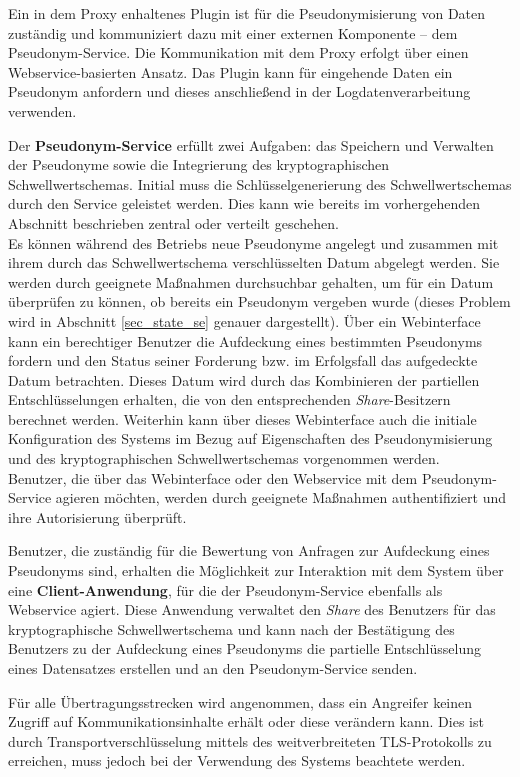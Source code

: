 Ein in dem Proxy enhaltenes Plugin ist für die Pseudonymisierung von Daten zuständig und kommuniziert dazu mit einer externen Komponente -- dem Pseudonym-Service. Die Kommunikation mit dem Proxy erfolgt über einen Webservice-basierten Ansatz. Das Plugin kann für eingehende Daten ein Pseudonym anfordern und dieses anschließend in der Logdatenverarbeitung verwenden.

Der \textbf{Pseudonym-Service} erfüllt zwei Aufgaben: das Speichern und Verwalten der Pseudonyme sowie die Integrierung des kryptographischen Schwellwertschemas. Initial muss die Schlüsselgenerierung des Schwellwertschemas durch den Service geleistet werden. Dies kann wie bereits im vorhergehenden Abschnitt beschrieben zentral oder verteilt geschehen.\\
Es können während des Betriebs neue Pseudonyme angelegt und zusammen mit ihrem durch das Schwellwertschema verschlüsselten Datum abgelegt werden. Sie werden durch geeignete Maßnahmen durchsuchbar gehalten, um für ein Datum überprüfen zu können, ob bereits ein Pseudonym vergeben wurde (dieses Problem wird in Abschnitt \ref{sec_state_se} genauer dargestellt).
Über ein Webinterface kann ein berechtiger Benutzer die Aufdeckung eines bestimmten Pseudonyms fordern und den Status seiner Forderung bzw. im Erfolgsfall das aufgedeckte Datum betrachten. Dieses Datum wird durch das Kombinieren der partiellen Entschlüsselungen erhalten, die von den entsprechenden \textit{Share}-Besitzern berechnet werden. Weiterhin kann über dieses Webinterface auch die initiale Konfiguration des Systems im Bezug auf Eigenschaften des Pseudonymisierung und des kryptographischen Schwellwertschemas vorgenommen werden.\\
Benutzer, die über das Webinterface oder den Webservice mit dem Pseudonym-Service agieren möchten, werden durch geeignete Maßnahmen authentifiziert und ihre Autorisierung überprüft.

Benutzer, die zuständig für die Bewertung von Anfragen zur Aufdeckung eines Pseudonyms sind, erhalten die Möglichkeit zur Interaktion mit dem System über eine \textbf{Client-Anwendung}, für die der Pseudonym-Service ebenfalls als Webservice agiert. Diese Anwendung verwaltet den \textit{Share} des Benutzers für das kryptographische Schwellwertschema und kann nach der Bestätigung des Benutzers zu der Aufdeckung eines Pseudonyms die partielle Entschlüsselung eines Datensatzes erstellen und an den Pseudonym-Service senden.

Für alle Übertragungsstrecken wird angenommen, dass ein Angreifer keinen Zugriff auf Kommunikationsinhalte erhält oder diese verändern kann. Dies ist durch Transportverschlüsselung mittels des weitverbreiteten TLS-Protokolls zu erreichen, muss jedoch bei der Verwendung des Systems beachtete werden. 
